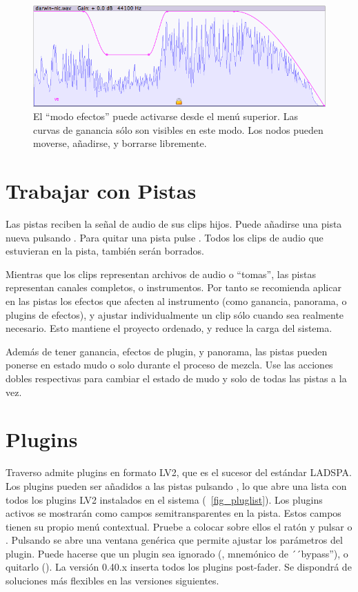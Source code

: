 \begin{figure}[t]
 \centering\includegraphics[width=\textwidth]{../images/gcurve01}
 \caption{El ``modo efectos'' puede activarse desde el menú superior. Las curvas de ganancia sólo son visibles en este modo. Los nodos pueden moverse, añadirse, y borrarse libremente.}
 \label{fig_gcurve01}
\end{figure}

\section{Trabajar con Pistas}
Las pistas reciben la señal de audio de sus clips hijos. Puede añadirse una pista nueva pulsando . Para quitar una pista pulse . Todos los clips de audio que estuvieran en la pista, también serán borrados.

Mientras que los clips representan archivos de audio o ``tomas'', las pistas representan canales completos, o instrumentos. Por tanto se recomienda aplicar en las pistas los efectos que afecten al instrumento (como ganancia, panorama, o plugins de efectos), y ajustar individualmente un clip sólo cuando sea realmente necesario. Esto mantiene el proyecto ordenado, y reduce la carga del sistema.

Además de tener ganancia, efectos de plugin, y panorama, las pistas pueden ponerse en estado mudo  o solo  durante el proceso de mezcla. Use las acciones dobles respectivas \dact{} para cambiar el estado de mudo y solo de todas las pistas a la vez.

\section{Plugins}
Traverso admite plugins en formato LV2, que es el sucesor del estándar LADSPA. Los plugins pueden ser añadidos a las pistas pulsando , lo que abre una lista con todos los plugins LV2 instalados en el sistema (\FigB~\ref{fig_pluglist}). Los plugins activos se mostrarán como campos semitransparentes en la pista. Estos campos tienen su propio menú contextual. Pruebe a colocar sobre ellos el ratón y pulsar  o . Pulsando  se abre una ventana genérica que permite ajustar los parámetros del plugin. Puede hacerse que un plugin sea ignorado (, mnemónico de ´´bypass''), o quitarlo (). La versión 0.40.x inserta todos los plugins post-fader. Se dispondrá de soluciones más flexibles en las versiones siguientes.

